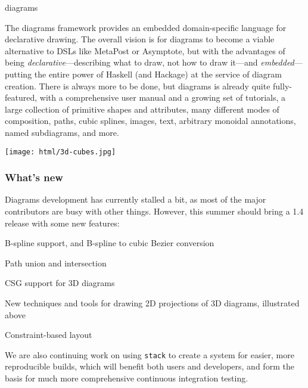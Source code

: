 \begin{hcarentry}[updated]{diagrams}
\makeheader

The diagrams framework provides an embedded domain-specific language
for declarative drawing.  The overall vision is for diagrams to become
a viable alternative to DSLs like MetaPost or Asymptote, but with the
advantages of being \emph{declarative}---describing what to draw, not
how to draw it---and \emph{embedded}---putting the entire power of
Haskell (and Hackage) at the service of diagram creation.  There is
always more to be done, but diagrams is already quite fully-featured,
with a comprehensive user manual and a growing set of tutorials, a
large collection of primitive shapes and attributes, many different
modes of composition, paths, cubic splines, images, text, arbitrary
monoidal annotations, named subdiagrams, and more.

\begin{center}
\texttt{[image: html/3d-cubes.jpg]}
\end{center}

\subsubsection*{What's new}

Diagrams development has currently stalled a bit, as most of the major
contributors are busy with other things.  However, this summer should
bring a 1.4 release with some new features:

\begin{compactitem}
\item B-spline support, and B-spline to cubic Bezier conversion
\item Path union and intersection
\item CSG support for 3D diagrams
\item New techniques and tools for drawing 2D projections of 3D
  diagrams, illustrated above
\item Constraint-based layout
\end{compactitem}

We are also continuing work on using \texttt{stack} to create a system
for easier, more reproducible builds, which will benefit both users
and developers, and form the basis for much more comprehensive
continuous integration testing.


\end{hcarentry}

